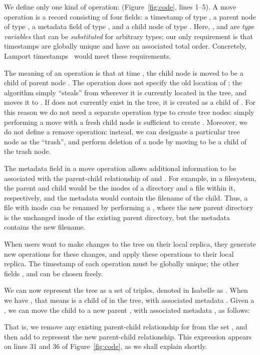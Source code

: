\documentclass[sigconf]{acmart}
\begin{document}
We define only one kind of operation:  (Figure~\ref{fig:code}, lines 1--5).
A move operation is a record consisting of four fields: a timestamp  of type , a parent node  of type , a metadata field  of type , and a child node  of type .
Here, ,  and  are \emph{type variables} that can be \emph{substituted} for arbitrary types; our only requirement is that timestamps  are globally unique and have an associated total order.
Concretely, Lamport timestamps~\cite{Lamport:1978jq} would meet these requirements.

The meaning of an operation  is that at time , the child node  is moved to be a child of parent node .
The operation does not specify the old location of ; the algorithm simply ``steals''  from wherever it is currently located in the tree, and moves it to .
If  does not currently exist in the tree, it is created as a child of .
For this reason we do not need a separate operation type to create tree nodes: simply performing a move with a fresh child node  is sufficient to create .
Moreover, we do not define a remove operation: instead, we can designate a particular tree node as the ``trash'', and perform deletion of a node  by moving  to be a child of the trash node.

The metadata field  in a move operation allows additional information to be associated with the parent-child relationship of  and .
For example, in a filesystem, the parent and child would be the inodes of a directory and a file within it, respectively, and the metadata would contain the filename of the child.
Thus, a file with inode  can be renamed by performing a , where the new parent directory  is the unchanged inode of the existing parent directory, but the metadata  contains the new filename.

When users want to make changes to the tree on their local replica, they generate new  operations for these changes, and apply these operations to their local replica.
The timestamp  of each operation must be globally unique; the other fields ,  and  can be chosen freely.

We can now represent the tree as a set of  triples, denoted in Isabelle as .
When we have , that means  is a child of  in the tree, with associated metadata .
Given a , we can move the child  to a new parent , with associated metadata , as follows:
\begin{quote}
\end{quote}
That is, we remove any existing parent-child relationship for  from the set , and then add  to represent the new parent-child relationship.
This expression appears on lines 31 and 36 of Figure~\ref{fig:code}, as we shall explain shortly.
\end{document}
